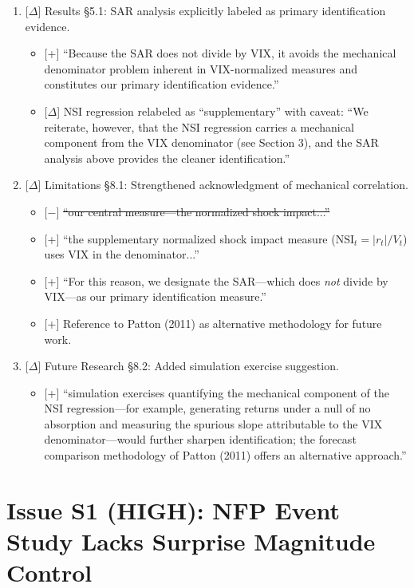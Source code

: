 \documentclass[12pt,a4paper]{article}
\newcommand{\added}[1]{\textcolor{addgreen}{[+] #1}}
\newcommand{\deleted}[1]{\textcolor{delred}{[$-$] \st{#1}}}
\newcommand{\modified}[1]{\textcolor{modblue}{[$\Delta$] #1}}
\begin{document}
\begin{enumerate}[leftmargin=*]
\item \modified{Results \S5.1: SAR analysis explicitly labeled as primary identification evidence.}
\begin{itemize}
\item \added{``Because the SAR does not divide by VIX, it avoids the mechanical denominator problem inherent in VIX-normalized measures and constitutes our primary identification evidence.''}
\item \modified{NSI regression relabeled as ``supplementary'' with caveat: ``We reiterate, however, that the NSI regression carries a mechanical component from the VIX denominator (see Section 3), and the SAR analysis above provides the cleaner identification.''}
\end{itemize}

\item \modified{Limitations \S8.1: Strengthened acknowledgment of mechanical correlation.}
\begin{itemize}
\item \deleted{``our central measure---the normalized shock impact...''}
\item \added{``the supplementary normalized shock impact measure ($\text{NSI}_t = |r_t| / V_t$) uses VIX in the denominator...''}
\item \added{``For this reason, we designate the SAR---which does \textit{not} divide by VIX---as our primary identification measure.''}
\item \added{Reference to Patton (2011) as alternative methodology for future work.}
\end{itemize}

\item \modified{Future Research \S8.2: Added simulation exercise suggestion.}
\begin{itemize}
\item \added{``simulation exercises quantifying the mechanical component of the NSI regression---for example, generating returns under a null of no absorption and measuring the spurious slope attributable to the VIX denominator---would further sharpen identification; the forecast comparison methodology of Patton (2011) offers an alternative approach.''}
\end{itemize}

\end{enumerate}

\section*{Issue S1 (HIGH): NFP Event Study Lacks Surprise Magnitude Control}
\end{document}
